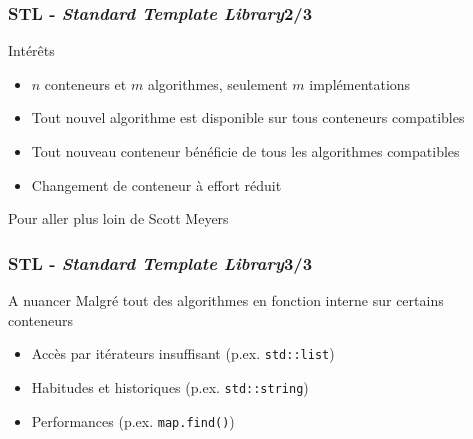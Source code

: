 \documentclass[C++.tex]{subfiles}
\begin{document}
\begin{frame}
	\frametitle{STL - \textit{Standard Template Library}\titlehfill{}2/3}
	\begin{block}{Intérêts}
		\begin{itemize}
			\item $n$ conteneurs et $m$ algorithmes, seulement $m$ implémentations


			\item Tout nouvel algorithme est disponible sur tous conteneurs compatibles
			\item Tout nouveau conteneur bénéficie de tous les algorithmes compatibles


			\item Changement de conteneur à effort réduit
		\end{itemize}
	\end{block}

	\begin{block}{Pour aller plus loin}
		\cite{effStl} de Scott Meyers
	\end{block}
\end{frame}

\begin{frame}
	\frametitle{STL - \textit{Standard Template Library}\titlehfill{}3/3}
	\begin{block}{A nuancer}
		Malgré tout des algorithmes en fonction interne sur certains conteneurs
		\begin{itemize}
			\item Accès par itérateurs insuffisant (p.ex. \lstinline|std::list|)
			\item Habitudes et historiques (p.ex. \lstinline|std::string|)
			\item Performances (p.ex. \lstinline|map.find()|)
		\end{itemize}
	\end{block}
\end{frame}
\end{document}
